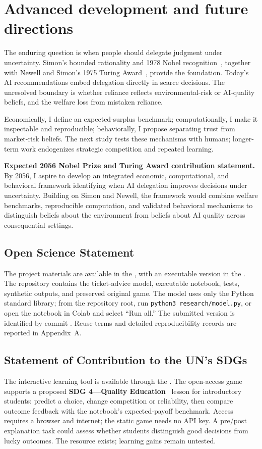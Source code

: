 \section{Advanced development and future directions}

The enduring question is when people should delegate judgment under uncertainty. Simon's bounded rationality and 1978 Nobel recognition~\cite{simon1955,nobel1978}, together with Newell and Simon's 1975 Turing Award~\cite{newell1976,turing1975}, provide the foundation. Today's AI recommendations embed delegation directly in scarce decisions. The unresolved boundary is whether reliance reflects environmental-risk or AI-quality beliefs, and the welfare loss from mistaken reliance.

Economically, I define an expected-surplus benchmark; computationally, I make it inspectable and reproducible; behaviorally, I propose separating trust from market-risk beliefs. The next study tests these mechanisms with humans; longer-term work endogenizes strategic competition and repeated learning.

\textbf{Expected 2056 Nobel Prize and Turing Award contribution statement.}
By 2056, I aspire to develop an integrated economic, computational, and behavioral framework identifying when AI delegation improves decisions under uncertainty. Building on Simon and Newell, the framework would combine welfare benchmarks, reproducible computation, and validated behavioral mechanisms to distinguish beliefs about the environment from beliefs about AI quality across consequential settings.

\subsection*{Open Science Statement}

The project materials are available in the \GitHubLink, with an executable version in the \ColabLink. The repository contains the ticket-advice model, executable notebook, tests, synthetic outputs, and preserved original game. The model uses only the Python standard library; from the repository root, run \texttt{python3 research/model.py}, or open the notebook in Colab and select ``Run all.'' The submitted version is identified by commit \texttt{\CommitHash}. Reuse terms and detailed reproducibility records are reported in Appendix~A.

\subsection*{Statement of Contribution to the UN's SDGs}
The interactive learning tool is available through the \DemoLink. The open-access game supports a proposed \textbf{SDG 4---Quality Education}~\cite{sdg4} lesson for introductory students: predict a choice, change competition or reliability, then compare outcome feedback with the notebook's expected-payoff benchmark. Access requires a browser and internet; the static game needs no API key. A pre/post explanation task could assess whether students distinguish good decisions from lucky outcomes. The resource exists; learning gains remain untested.
